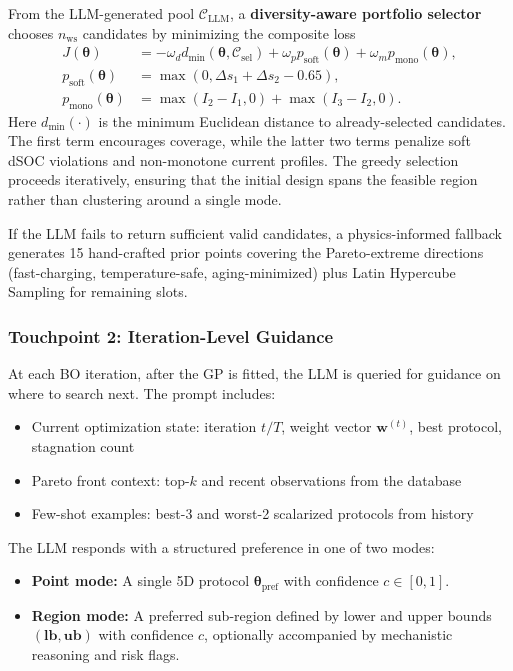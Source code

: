 \documentclass[journal]{IEEEtran}
\newcommand{\btheta}{\boldsymbol{\theta}}
\newcommand{\bw}{\boldsymbol{w}}
\begin{document}
From the LLM-generated pool $\mathcal{C}_{\text{LLM}}$, a \textbf{diversity-aware portfolio selector} chooses $n_{\text{ws}}$ candidates by minimizing the composite loss
\begin{align}
J(\btheta) &=
-\omega_d d_{\min}(\btheta,\mathcal{C}_{\text{sel}})
+\omega_p p_{\text{soft}}(\btheta)
+\omega_m p_{\text{mono}}(\btheta),
\label{eq:portfolio}\\
p_{\text{soft}}(\btheta) &= \max(0,\Delta s_1+\Delta s_2-0.65), \nonumber\\
p_{\text{mono}}(\btheta) &= \max(I_2-I_1,0)+\max(I_3-I_2,0). \nonumber
\end{align}
Here $d_{\min}(\cdot)$ is the minimum Euclidean distance to already-selected candidates. The first term encourages coverage, while the latter two terms penalize soft dSOC violations and non-monotone current profiles. The greedy selection proceeds iteratively, ensuring that the initial design spans the feasible region rather than clustering around a single mode.

If the LLM fails to return sufficient valid candidates, a physics-informed fallback generates 15 hand-crafted prior points covering the Pareto-extreme directions (fast-charging, temperature-safe, aging-minimized) plus Latin Hypercube Sampling for remaining slots.

\subsubsection{Touchpoint 2: Iteration-Level Guidance}
\label{sec:guidance}

At each BO iteration, after the GP is fitted, the LLM is queried for guidance on where to search next. The prompt includes:
\begin{itemize}
\item Current optimization state: iteration $t/T$, weight vector $\bw^{(t)}$, best protocol, stagnation count
\item Pareto front context: top-$k$ and recent observations from the database
\item Few-shot examples: best-3 and worst-2 scalarized protocols from history
\end{itemize}

The LLM responds with a structured preference in one of two modes:
\begin{itemize}
\item \textbf{Point mode:} A single 5D protocol $\btheta_{\text{pref}}$ with confidence $c \in [0,1]$.
\item \textbf{Region mode:} A preferred sub-region defined by lower and upper bounds $(\mathbf{lb}, \mathbf{ub})$ with confidence $c$, optionally accompanied by mechanistic reasoning and risk flags.
\end{itemize}
\end{document}
